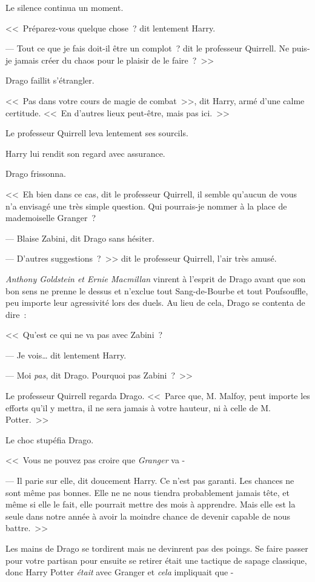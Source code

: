 Le silence continua un moment.

<<~Préparez-vous quelque chose~? dit lentement Harry.

--- Tout ce que je fais doit-il être un complot~? dit le professeur Quirrell. Ne puis-je jamais créer du chaos pour le plaisir de le faire~?~>>

Drago faillit s'étrangler.

<<~Pas dans votre cours de magie de combat~>>, dit Harry, armé d'une calme certitude. <<~En d'autres lieux peut-être, mais pas ici.~>>

Le professeur Quirrell leva lentement ses sourcils.

Harry lui rendit son regard avec assurance.

Drago frissonna.

<<~Eh bien dans ce cas, dit le professeur Quirrell, il semble qu'aucun de vous n'a envisagé une très simple question. Qui pourrais-je nommer à la place de mademoiselle Granger~?

--- Blaise Zabini, dit Drago sans hésiter.

--- D'autres suggestions~?~>> dit le professeur Quirrell, l'air très amusé.

\emph{Anthony Goldstein et Ernie Macmillan} vinrent à l'esprit de Drago avant que son bon sens ne prenne le dessus et n'exclue tout Sang-de-Bourbe et tout Poufsouffle, peu importe leur agressivité lors des duels. Au lieu de cela, Drago se contenta de dire~:

<<~Qu'est ce qui ne va pas avec Zabini~?

--- Je vois… dit lentement Harry.

--- Moi \emph{pas}, dit Drago. Pourquoi pas Zabini~?~>>

Le professeur Quirrell regarda Drago. <<~Parce que, M. Malfoy, peut importe les efforts qu'il y mettra, il ne sera jamais à votre hauteur, ni à celle de M. Potter.~>>

Le choc stupéfia Drago.

<<~Vous ne pouvez pas croire que \emph{Granger} va -

--- Il parie sur elle, dit doucement Harry. Ce n'est pas garanti. Les chances ne sont même pas bonnes. Elle ne ne nous tiendra probablement jamais tête, et même si elle le fait, elle pourrait mettre des mois à apprendre. Mais elle est la seule dans notre année à avoir la moindre chance de devenir capable de nous battre.~>>

Les mains de Drago se tordirent mais ne devinrent pas des poings. Se faire passer pour votre partisan pour ensuite se retirer était une tactique de sapage classique, donc Harry Potter \emph{était} avec Granger et \emph{cela} impliquait que -

